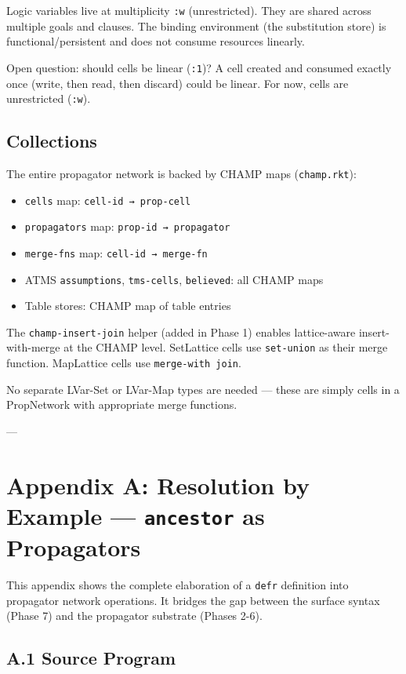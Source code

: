 \documentclass[11pt]{article}
\begin{document}
Logic variables live at multiplicity \texttt{:w} (unrestricted). They are shared
across multiple goals and clauses. The binding environment (the substitution
store) is functional/persistent and does not consume resources linearly.

Open question: should cells be linear (\texttt{:1})? A cell created and consumed
exactly once (write, then read, then discard) could be linear. For now,
cells are unrestricted (\texttt{:w}).
\subsection{Collections}
\label{sec:orgfa4ec0a}

The entire propagator network is backed by CHAMP maps (\texttt{champ.rkt}):
\begin{itemize}
\item \texttt{cells} map: \texttt{cell-id → prop-cell}
\item \texttt{propagators} map: \texttt{prop-id → propagator}
\item \texttt{merge-fns} map: \texttt{cell-id → merge-fn}
\item ATMS \texttt{assumptions}, \texttt{tms-cells}, \texttt{believed}: all CHAMP maps
\item Table stores: CHAMP map of table entries
\end{itemize}

The \texttt{champ-insert-join} helper (added in Phase 1) enables lattice-aware
insert-with-merge at the CHAMP level. SetLattice cells use \texttt{set-union}
as their merge function. MapLattice cells use \texttt{merge-with join}.

No separate LVar-Set or LVar-Map types are needed — these are simply
cells in a PropNetwork with appropriate merge functions.

---
\section{Appendix A: Resolution by Example — \texttt{ancestor} as Propagators}
\label{sec:orgb1bcb32}

This appendix shows the complete elaboration of a \texttt{defr} definition into
propagator network operations. It bridges the gap between the surface syntax
(Phase 7) and the propagator substrate (Phases 2-6).
\subsection{A.1 Source Program}
\label{sec:orgf103a5e}
\end{document}
